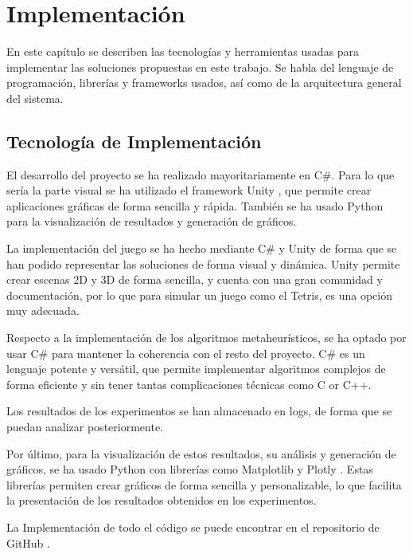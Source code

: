 \documentclass[11pt,spanish,listoffigures,listoftables]{tfgetsinf}
\begin{document}
    
\chapter{Implementación}
En este capítulo se describen las tecnologías y herramientas usadas para implementar las soluciones propuestas en este trabajo. Se habla del lenguaje de programación, librerías y frameworks usados, así como de la arquitectura general del sistema.

\section{Tecnología de Implementación}
El desarrollo del proyecto se ha realizado mayoritariamente en C\#. Para lo que sería la parte visual se ha utilizado el framework Unity \cite{}, que permite crear aplicaciones gráficas de forma sencilla y rápida. También se ha usado Python para la visualización de resultados y generación de gráficos.

La implementación del juego se ha hecho mediante C\# y Unity de forma que se han podido representar las soluciones de forma visual y dinámica. Unity permite crear escenas 2D y 3D de forma sencilla, y cuenta con una gran comunidad y documentación, por lo que para simular un juego como el Tetris, es una opción muy adecuada.

Respecto a la implementación de los algoritmos metaheurísticos, se ha optado por usar C\# para mantener la coherencia con el resto del proyecto. C\# es un lenguaje potente y versátil, que permite implementar algoritmos complejos de forma eficiente y sin tener tantas complicaciones técnicas como C or C++.

Los resultados de los experimentos se han almacenado en logs, de forma que se puedan analizar posteriormente.

Por último, para la visualización de estos resultados, su análisis y generación de gráficos, se ha usado Python con librerías como Matplotlib \cite{} y Plotly \cite{}. Estas librerías permiten crear gráficos de forma sencilla y personalizable, lo que facilita la presentación de los resultados obtenidos en los experimentos.

La Implementación de todo el código se puede encontrar en el repositorio de GitHub \cite{}.
\end{document}
